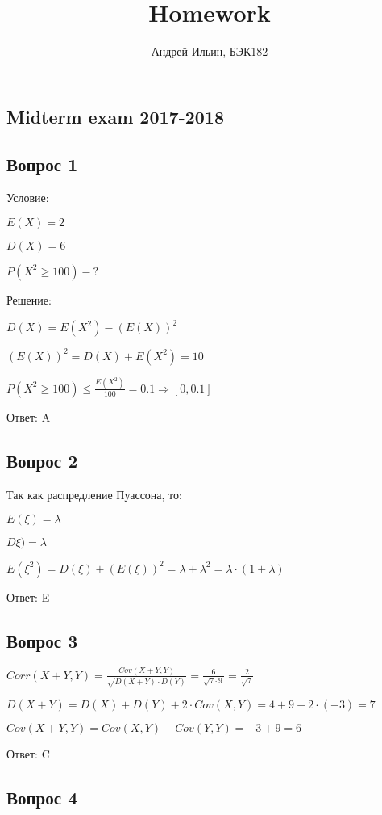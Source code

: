 \documentclass{article}
\title{Homework}
\author{Андрей Ильин, БЭК182}
\begin{document}
\maketitle

\begin{flushleft}

\section{Midterm exam 2017-2018}

\subsection{Вопрос 1}

Условие:

$E(X) = 2$

$D(X) = 6$

$P(X^2 \geq 100) - ?$ 

Решение:

$D(X) = E(X^2) - (E(X))^2$

$(E(X))^2 = D(X) + E(X^2) = 10$

$P(X^2 \geq 100) \leq \frac{E(X^2)}{100} = 0.1  \Rightarrow [0, 0.1]$

Ответ: A

\subsection{Вопрос 2}

Так как распредление Пуассона, то:

$E(\xi) =\lambda$

$D\xi) =\lambda$

$E(\xi^2) = D(\xi) + (E(\xi))^2 = \lambda + \lambda^2 = \lambda \cdot (1 + \lambda)$

Ответ: E

\subsection{Вопрос 3}

$Corr(X+Y,Y) = \frac{Cov(X+Y,Y)}{\sqrt{D(X+Y)\cdot D(Y)}} = \frac{6}{\sqrt{7\cdot 9}} = \frac{2}{\sqrt{7}}$

$D(X+Y) = D(X) + D(Y) + 2 \cdot Cov(X,Y) = 4 + 9 + 2 \cdot (-3) = 7$

$Cov(X+Y,Y) = Cov(X,Y) + Cov(Y,Y) = -3 + 9 = 6$

Ответ: C

\subsection{Вопрос 4}


\end{flushleft}
\end{document}
